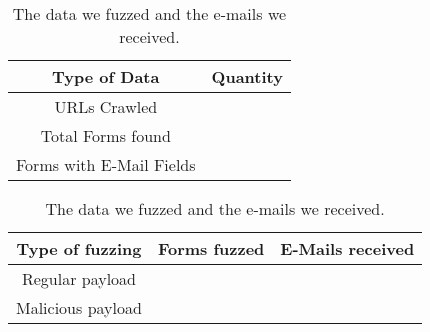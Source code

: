 \begin{table}[tbp]
	\parbox{.40\textwidth}{
			\centering
			\scriptsize
			\begin{tabular}{|c|c|}
				\hline
				\multicolumn{1}{|c|}{\textbf{Type of Data}} &
				\multicolumn{1}{c|}{\textbf{Quantity}}\\
				\hline
				URLs Crawled & \urls \\
				\hline
				Total Forms found & \forms \\
				\hline
				Forms with E-Mail Fields & \emailforms \\
				\hline
			\end{tabular}
			\caption[]{The data collected for our
				project.}
			
			\label{tab:data}
			
		}
	\hfill
	\parbox{.55\textwidth}{
			\centering
			\scriptsize
			\begin{tabular}{|c|c|c|}
				\hline
				\multicolumn{1}{|c|}{\textbf{Type of fuzzing}} &
				\multicolumn{1}{c|}{\textbf{Forms fuzzed}} &
				\multicolumn{1}{c|}{\textbf{E-Mails received}}\\
				\hline
				Regular payload & \fuzzed & \recd \\
				\hline
				Malicious payload & \malfuzzed & \success \\
				\hline
			\end{tabular}
			\caption[]{The data we fuzzed and the e-mails we received.}
			
			\label{tab:fuzzed_data}
			
		}
\end{table}
